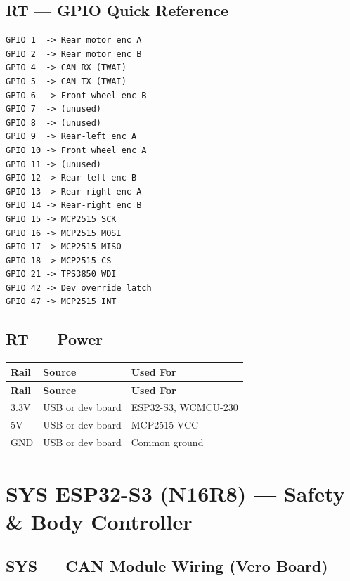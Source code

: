 \documentclass[10pt,a4paper,oneside]{report}
\begin{document}
\section{RT — GPIO Quick Reference}

\begin{lstlisting}
GPIO 1  -> Rear motor enc A
GPIO 2  -> Rear motor enc B
GPIO 4  -> CAN RX (TWAI)
GPIO 5  -> CAN TX (TWAI)
GPIO 6  -> Front wheel enc B
GPIO 7  -> (unused)
GPIO 8  -> (unused)
GPIO 9  -> Rear-left enc A
GPIO 10 -> Front wheel enc A
GPIO 11 -> (unused)
GPIO 12 -> Rear-left enc B
GPIO 13 -> Rear-right enc A
GPIO 14 -> Rear-right enc B
GPIO 15 -> MCP2515 SCK
GPIO 16 -> MCP2515 MOSI
GPIO 17 -> MCP2515 MISO
GPIO 18 -> MCP2515 CS
GPIO 21 -> TPS3850 WDI
GPIO 42 -> Dev override latch
GPIO 47 -> MCP2515 INT
\end{lstlisting}

\section{RT — Power}

\begin{longtable}{|L{1.2cm}|L{3cm}|L{5cm}|}
\hline
\textbf{Rail} & \textbf{Source} & \textbf{Used For} \\
\hline
\endfirsthead\hline
\textbf{Rail} & \textbf{Source} & \textbf{Used For} \\
\hline
\endhead
3.3V & USB or dev board & ESP32-S3, WCMCU-230 \\
\hline
5V & USB or dev board & MCP2515 VCC \\
\hline
GND & USB or dev board & Common ground \\
\hline
\end{longtable}

\newpage


\chapter{SYS ESP32-S3 (N16R8) — Safety \& Body Controller}

\section{SYS — CAN Module Wiring (Vero Board)}
\end{document}
